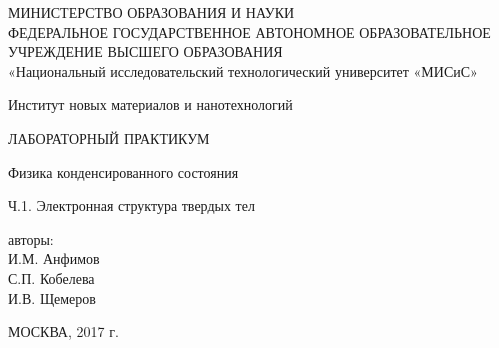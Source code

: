 \begin{titlepage}
\newpage

\begin{center}
МИНИСТЕРСТВО ОБРАЗОВАНИЯ И НАУКИ \\
ФЕДЕРАЛЬНОЕ ГОСУДАРСТВЕННОЕ АВТОНОМНОЕ ОБРАЗОВАТЕЛЬНОЕ УЧРЕЖДЕНИЕ ВЫСШЕГО ОБРАЗОВАНИЯ \\
«Национальный исследовательский технологический университет «МИСиС»

Институт новых материалов и нанотехнологий

\vspace{3cm}

ЛАБОРАТОРНЫЙ ПРАКТИКУМ

Физика конденсированного состояния

Ч.1. Электронная структура твердых тел

\vspace{3cm}

авторы: \\
И.М. Анфимов \\
С.П. Кобелева \\
И.В. Щемеров

\vspace{5cm}

МОСКВА, 2017 г.
\end{center}

\end{titlepage}